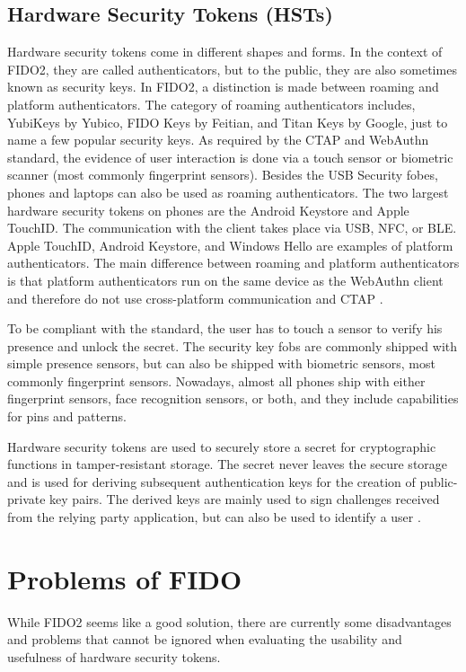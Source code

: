 \documentclass[runningheads]{llncs}
\begin{document}
\subsection{Hardware Security Tokens (HSTs)}
Hardware security tokens come in different shapes and forms. In the context of FIDO2, they are called authenticators, but to the public, they are also sometimes known as security keys. In FIDO2, a distinction is made between roaming and platform authenticators. The category of roaming authenticators includes, YubiKeys by Yubico, FIDO Keys by Feitian, and Titan Keys by Google, just to name a few popular security keys. As required by the CTAP and WebAuthn standard, the evidence of user interaction is done via a touch sensor or biometric scanner (most commonly fingerprint sensors). Besides the USB Security fobes, phones and laptops can also be used as roaming authenticators. The two largest hardware security tokens on phones are the Android Keystore and Apple TouchID. The communication with the client takes place via USB, NFC, or BLE.
Apple TouchID, Android Keystore, and Windows Hello are examples of platform authenticators. The main difference between roaming and platform authenticators is that platform authenticators run on the same device as the WebAuthn client and therefore do not use cross-platform communication and CTAP \cite{9152694}. 

To be compliant with the standard, the user has to touch a sensor to verify his presence and unlock the secret. The security key fobs are commonly shipped with simple presence sensors, but can also be shipped with biometric sensors, most commonly fingerprint sensors. Nowadays, almost all phones ship with either fingerprint sensors, face recognition sensors, or both, and they include capabilities for pins and patterns.

Hardware security tokens are used to securely store a secret for cryptographic functions in tamper-resistant storage. The secret never leaves the secure storage and is used for deriving subsequent authentication keys for the creation of public-private key pairs. The derived keys are mainly used to sign challenges received from the relying party application, but can also be used to identify a user \cite{272198}.

\section{Problems of FIDO}
While FIDO2 seems like a good solution, there are currently some disadvantages and problems that cannot be ignored when evaluating the usability and usefulness of hardware security tokens.
\end{document}
